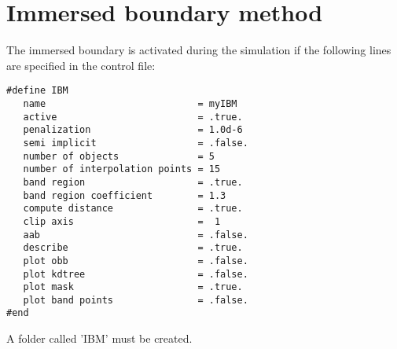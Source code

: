 \documentclass[a4paper,10pt]{report}
\begin{document}

\chapter{Immersed boundary method}

The immersed boundary is activated during the simulation if the following lines are specified in the control file:
\begin{lstlisting}
#define IBM
   name                           = myIBM
   active                         = .true.
   penalization                   = 1.0d-6
   semi implicit                  = .false.
   number of objects              = 5 
   number of interpolation points = 15
   band region                    = .true.
   band region coefficient        = 1.3
   compute distance               = .true.
   clip axis                      =  1
   aab                            = .false.
   describe                       = .true.
   plot obb                       = .false.
   plot kdtree                    = .false.
   plot mask                      = .true.
   plot band points               = .false.
#end
\end{lstlisting}

A folder called 'IBM' must be created.
\end{document}
